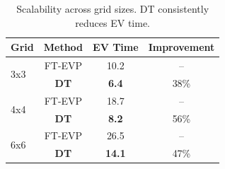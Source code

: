 \begin{table}[t]
  \caption{Scalability across grid sizes. DT consistently reduces EV time.}
  \label{tab:scalability}
  \centering
  \begin{tabular}{lccc}
    \toprule
    \textbf{Grid} & \textbf{Method} & \textbf{EV Time} & \textbf{Improvement} \\
    \midrule
    \multirow{2}{*}{3x3} & FT-EVP & 10.2 & -- \\
    & \textbf{DT} & \textbf{6.4} & 38\% \\
    \midrule
    \multirow{2}{*}{4x4} & FT-EVP & 18.7 & -- \\
    & \textbf{DT} & \textbf{8.2} & 56\% \\
    \midrule
    \multirow{2}{*}{6x6} & FT-EVP & 26.5 & -- \\
    & \textbf{DT} & \textbf{14.1} & 47\% \\
    \bottomrule
  \end{tabular}
\end{table}